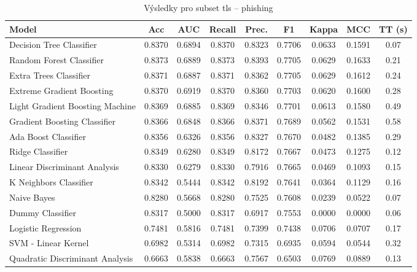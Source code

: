 \begin{table}[H]
  \centering
  \small
  \caption{Výsledky pro subset tls – phishing}
  \begin{tabular}{|l|c|c|c|c|c|c|c|c|}
    \hline
    \textbf{Model} & \textbf{Acc} & \textbf{AUC} & \textbf{Recall} & \textbf{Prec.} & \textbf{F1} & \textbf{Kappa} & \textbf{MCC} & \textbf{TT (s)} \\
    \hline
    Decision Tree Classifier & 0.8370 & 0.6894 & 0.8370 & 0.8323 & 0.7706 & 0.0633 & 0.1591 & 0.07 \\
    Random Forest Classifier & 0.8373 & 0.6889 & 0.8373 & 0.8393 & 0.7705 & 0.0629 & 0.1633 & 0.21 \\
    Extra Trees Classifier & 0.8371 & 0.6887 & 0.8371 & 0.8362 & 0.7705 & 0.0629 & 0.1612 & 0.24 \\
    Extreme Gradient Boosting & 0.8370 & 0.6919 & 0.8370 & 0.8360 & 0.7703 & 0.0620 & 0.1600 & 0.28 \\
    Light Gradient Boosting Machine & 0.8369 & 0.6885 & 0.8369 & 0.8346 & 0.7701 & 0.0613 & 0.1580 & 0.49 \\
    Gradient Boosting Classifier & 0.8366 & 0.6848 & 0.8366 & 0.8371 & 0.7689 & 0.0562 & 0.1531 & 0.58 \\
    Ada Boost Classifier & 0.8356 & 0.6326 & 0.8356 & 0.8327 & 0.7670 & 0.0482 & 0.1385 & 0.29 \\
    Ridge Classifier & 0.8349 & 0.6280 & 0.8349 & 0.8172 & 0.7667 & 0.0473 & 0.1275 & 0.12 \\
    Linear Discriminant Analysis & 0.8330 & 0.6279 & 0.8330 & 0.7916 & 0.7665 & 0.0469 & 0.1093 & 0.15 \\
    K Neighbors Classifier & 0.8342 & 0.5444 & 0.8342 & 0.8192 & 0.7641 & 0.0364 & 0.1129 & 0.16 \\
    Naive Bayes & 0.8280 & 0.5668 & 0.8280 & 0.7525 & 0.7608 & 0.0239 & 0.0522 & 0.07 \\
    Dummy Classifier & 0.8317 & 0.5000 & 0.8317 & 0.6917 & 0.7553 & 0.0000 & 0.0000 & 0.06 \\
    Logistic Regression & 0.7481 & 0.5816 & 0.7481 & 0.7399 & 0.7438 & 0.0706 & 0.0707 & 0.17 \\
    SVM - Linear Kernel & 0.6982 & 0.5314 & 0.6982 & 0.7315 & 0.6935 & 0.0594 & 0.0544 & 0.32 \\
    Quadratic Discriminant Analysis & 0.6663 & 0.5838 & 0.6663 & 0.7567 & 0.6503 & 0.0769 & 0.0889 & 0.13 \\
    \hline
  \end{tabular}
\end{table}
\vspace{0.5cm}

